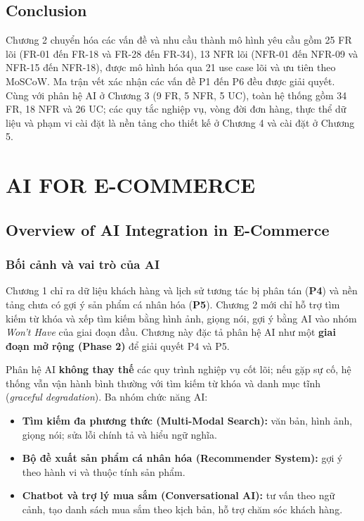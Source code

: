 \documentclass[12pt,a4paper,oneside]{report}
\begin{document}
\section{Conclusion}

Chương 2 chuyển hóa các vấn đề và nhu cầu thành mô hình yêu cầu gồm 25 FR lõi (FR-01 đến FR-18 và FR-28 đến FR-34), 13 NFR lõi (NFR-01 đến NFR-09 và NFR-15 đến NFR-18), được mô hình hóa qua 21 use case lõi và ưu tiên theo MoSCoW. Ma trận vết xác nhận các vấn đề P1 đến P6 đều được giải quyết. Cùng với phân hệ AI ở Chương 3 (9 FR, 5 NFR, 5 UC), toàn hệ thống gồm 34 FR, 18 NFR và 26 UC; các quy tắc nghiệp vụ, vòng đời đơn hàng, thực thể dữ liệu và phạm vi cài đặt là nền tảng cho thiết kế ở Chương 4 và cài đặt ở Chương 5.

\chapter{AI FOR E-COMMERCE}

\section{Overview of AI Integration in E-Commerce}

\subsection{Bối cảnh và vai trò của AI}

Chương 1 chỉ ra dữ liệu khách hàng và lịch sử tương tác bị phân tán (\textbf{P4}) và nền tảng chưa có gợi ý sản phẩm cá nhân hóa (\textbf{P5}). Chương 2 mới chỉ hỗ trợ tìm kiếm từ khóa và xếp tìm kiếm bằng hình ảnh, giọng nói, gợi ý bằng AI vào nhóm \emph{Won't Have} của giai đoạn đầu. Chương này đặc tả phân hệ AI như một \textbf{giai đoạn mở rộng (Phase 2)} để giải quyết P4 và P5.

Phân hệ AI \textbf{không thay thế} các quy trình nghiệp vụ cốt lõi; nếu gặp sự cố, hệ thống vẫn vận hành bình thường với tìm kiếm từ khóa và danh mục tĩnh (\emph{graceful degradation}). Ba nhóm chức năng AI:

\begin{itemize}
  \item \textbf{Tìm kiếm đa phương thức (Multi-Modal Search):} văn bản, hình ảnh, giọng nói; sửa lỗi chính tả và hiểu ngữ nghĩa.
  \item \textbf{Bộ đề xuất sản phẩm cá nhân hóa (Recommender System):} gợi ý theo hành vi và thuộc tính sản phẩm.
  \item \textbf{Chatbot và trợ lý mua sắm (Conversational AI):} tư vấn theo ngữ cảnh, tạo danh sách mua sắm theo kịch bản, hỗ trợ chăm sóc khách hàng.
\end{itemize}
\end{document}
